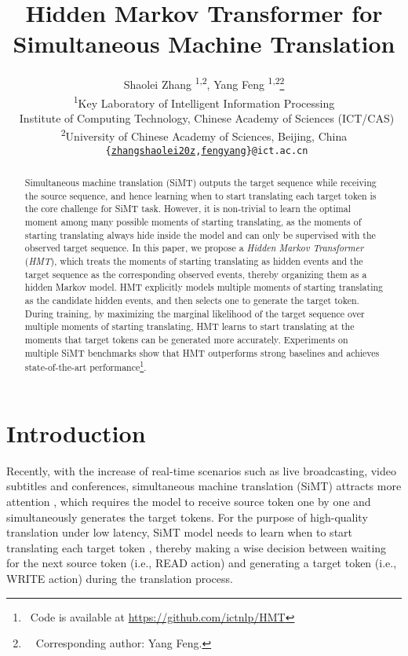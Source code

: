 \documentclass{article} %
\title{Hidden Markov Transformer for \\Simultaneous Machine Translation}
\author{Shaolei Zhang \textsuperscript{\rm 1,2},
    Yang Feng \textsuperscript{\rm 1,2}\thanks{ \ \ Corresponding author: Yang Feng.} \\
\textsuperscript{\rm 1}{Key Laboratory of Intelligent Information Processing} \\ $\;\:$Institute of Computing Technology, Chinese Academy of Sciences (ICT/CAS)\\
\textsuperscript{\rm 2}{University of Chinese Academy of Sciences, Beijing, China}\\
$\;\:$\texttt{\{\href{mailto:zhangshaolei20z@ict.ac.cn}{zhangshaolei20z},\href{mailto:fengyang@ict.ac.cn}{fengyang}\}@ict.ac.cn}}
\begin{document}
\maketitle

\begin{abstract}
Simultaneous machine translation (SiMT) outputs the target sequence while receiving the source sequence, and hence learning when to start translating each target token is the core challenge for SiMT task. However, it is non-trivial to learn the optimal moment among many possible moments of starting translating, as the moments of starting translating always hide inside the model and can only be supervised with the observed target sequence. In this paper, we propose a \emph{Hidden Markov Transformer} (\emph{HMT}), which treats the moments of starting translating as hidden events and the target sequence as the corresponding observed events, thereby organizing them as a hidden Markov model. HMT explicitly models multiple moments of starting translating as the candidate hidden events, and then selects one to generate the target token. During training, by maximizing the marginal likelihood of the target sequence over multiple moments of starting translating, HMT learns to start translating at the moments that target tokens can be generated more accurately. Experiments on multiple SiMT benchmarks show that HMT outperforms strong baselines and achieves state-of-the-art performance\footnote{$\;\:$Code is available at \url{https://github.com/ictnlp/HMT}}.
\end{abstract}

\section{Introduction}
Recently, with the increase of real-time scenarios such as live broadcasting, video subtitles and conferences, simultaneous machine translation (SiMT) attracts more attention \citep{Cho2016,gu-etal-2017-learning,ma-etal-2019-stacl,Arivazhagan2019}, which requires the model to receive source token one by one and simultaneously generates the target tokens. For the purpose of high-quality translation under low latency, SiMT model needs to learn when to start translating each target token \citep{gu-etal-2017-learning}, thereby making a wise decision between waiting for the next source token (i.e., READ action) and generating a target token (i.e., WRITE action) during the translation process.
\end{document}
